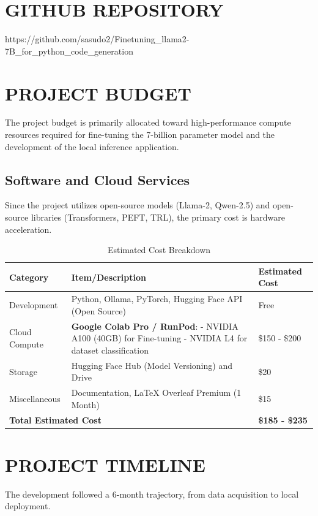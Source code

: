 \chapter{GITHUB REPOSITORY}
https://github.com/sasudo2/Finetuning\_llama2-7B\_for\_python\_code\_generation


\chapter{PROJECT BUDGET}
The project budget is primarily allocated toward high-performance compute resources required for fine-tuning the 7-billion parameter model and the development of the local inference application.

\section{Software and Cloud Services}
Since the project utilizes open-source models (Llama-2, Qwen-2.5) and open-source libraries (Transformers, PEFT, TRL), the primary cost is hardware acceleration.

\begin{table}[H]
    \centering
    \small
    \caption{Estimated Cost Breakdown}
    \begin{tabular}{p{2.7cm}p{6.5cm}p{2.5cm}}
        \toprule
        \textbf{Category} & \textbf{Item/Description} & \textbf{Estimated Cost} \\
        \midrule
        Development & Python, Ollama, PyTorch, Hugging Face API (Open Source) & Free \\
        Cloud Compute & \textbf{Google Colab Pro / RunPod}: \newline
        - NVIDIA A100 (40GB) for Fine-tuning \newline
        - NVIDIA L4 for dataset classification & \$150 - \$200 \\
        Storage & Hugging Face Hub (Model Versioning) and Drive & \$20 \\
        Miscellaneous & Documentation, LaTeX Overleaf Premium (1 Month) & \$15 \\
        \midrule
        \multicolumn{2}{l}{\textbf{Total Estimated Cost}} & \textbf{\$185 - \$235} \\
        \bottomrule
    \end{tabular}
    \label{tab:project_budget_final}
\end{table}

\chapter{PROJECT TIMELINE}
The development followed a 6-month trajectory, from data acquisition to local deployment.

